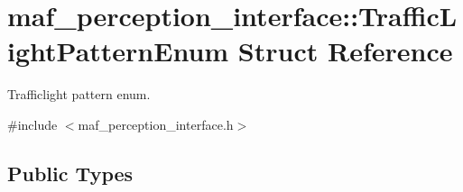 \hypertarget{structmaf__perception__interface_1_1TrafficLightPatternEnum}{}\section{maf\+\_\+perception\+\_\+interface\+:\+:Traffic\+Light\+Pattern\+Enum Struct Reference}
\label{structmaf__perception__interface_1_1TrafficLightPatternEnum}


Trafficlight pattern enum.  




{\ttfamily \#include $<$maf\+\_\+perception\+\_\+interface.\+h$>$}

\subsection*{Public Types}
